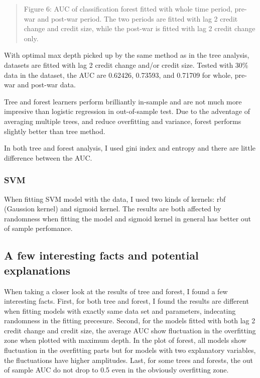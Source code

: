 \documentclass{article}
\newcommand{\ciapdf}[1]{\vspace*{-\parskip}\begin{center}\resizebox{0.75\textwidth}{!}{\texttt{[image: \#1]}}\end{center}}
\begin{document}
\ciapdf{Figure_7.pdf}
\begin{quote}
Figure 6: AUC of classification forest fitted with whole time period,
pre-war and post-war period. The two periods are fitted with lag 2 credit
change and credit size, while the post-war is fitted with lag 2 credit change
only.
\end{quote}

With optimal max depth picked up by the same method as in the tree
analysis, datasets are fitted with lag 2 credit change and/or credit
size. Tested with 30\% data in the dataset, the AUC are 0.62426,
0.73593, and 0.71709 for whole, pre-war and post-war data.

Tree and forest learners perform brilliantly in-sample and
are not much more impresive than logistic regression in out-of-sample test. Due
to the adventage of averaging multiple trees, and reduce overfitting and
variance, forest
performs slightly better than tree method.

In both tree and forest analysis, I used gini index and entropy and
there are little difference between the AUC.

\subsubsection*{SVM}

When fitting SVM model with the data, I used two kinds of kernels:
rbf (Gaussion kernel) and sigmoid kernel. The results are both affected
by randomness when fitting the model and sigmoid kernel in general has
better out of sample perfomance. 


\subsection*{A few interesting facts and potential explanations}


When taking a closer look at the results of tree and forest, I found a
few interesting facts. First, for both tree and forest, I found the
results are different when fitting models with exactly same data set and
parameters, indecating randomness in the
fitting precesure. Second, for the
models fitted with both lag 2 credit change and credit size, the average
AUC show fluctuation in the overfitting zone when plotted with maximum depth.
In the plot of forest,
all models show fluctuation in the overfitting parts but for models
with two explanatory variables, the fluctuations have higher amplitudes.
Last, for some trees and forests, the out
of sample AUC do not drop to 0.5 even in the obviously overfitting
zone.
\end{document}
